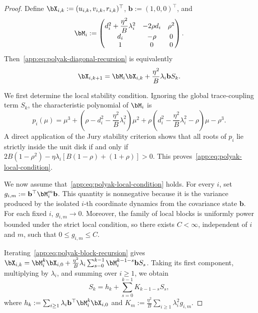 \begin{proof}
Define \(\bX_{i,k}:=(u_{i,k},v_{i,k},r_{i,k})^\top\),
\(\mathbf b:=(1,0,0)^\top\), and
\[
\bM_i
:=
\begin{pmatrix}
d_i^2+\dfrac{\eta^2}{B}\lambda_i^2 & -2\rho d_i & \rho^2\\
d_i & -\rho & 0\\
1 & 0 & 0
\end{pmatrix}.
\]
Then~\eqref{app:eq:polyak-diagonal-recursion} is equivalently
\begin{equation}
\label{app:eq:polyak-block-recursion}
\bX_{i,k+1}
=
\bM_i\bX_{i,k}
+
\frac{\eta^2}{B}\lambda_i\mathbf b S_k.
\end{equation}

We first determine the local stability condition. Ignoring the global trace-coupling term \(S_k\), the characteristic polynomial of \(\bM_i\) is
\[
p_i(\mu)
=
\mu^3
+
\left(\rho-d_i^2-\frac{\eta^2}{B}\lambda_i^2\right)\mu^2
+
\rho\left(d_i^2-\frac{\eta^2}{B}\lambda_i^2-\rho\right)\mu
-\rho^3.
\]
A direct application of the Jury stability criterion shows that all roots of \(p_i\) lie strictly inside the unit disk if and only if
\(2B(1-\rho^2)-\eta\lambda_i[B(1-\rho)+(1+\rho)]>0\).
This proves~\eqref{app:eq:polyak-local-condition}.

We now assume that~\eqref{app:eq:polyak-local-condition} holds. For every \(i\), set
\(g_{i,m}:=\mathbf b^\top\bM_i^m\mathbf b\). This quantity is nonnegative because it is the variance produced by the isolated \(i\)-th coordinate dynamics from the covariance state \(\mathbf b\). For each fixed \(i\), \(g_{i,m}\to0\). Moreover, the family of local blocks is uniformly power bounded under the strict local condition, so there exists \(C<\infty\), independent of \(i\) and \(m\), such that \(0\leq g_{i,m}\leq C\).

Iterating~\eqref{app:eq:polyak-block-recursion} gives
\(\bX_{i,k}=\bM_i^k\bX_{i,0}
+\frac{\eta^2}{B}\lambda_i\sum_{s=0}^{k-1}
\bM_i^{k-1-s}\mathbf bS_s\).
Taking its first component, multiplying by \(\lambda_i\), and summing over \(i\geq1\), we obtain
\begin{equation}
\label{app:eq:polyak-renewal}
S_k
=
h_k
+
\sum_{s=0}^{k-1}K_{k-1-s}S_s,
\end{equation}
where
\(h_k:=\sum_{i\geq1}\lambda_i\mathbf b^\top\bM_i^k\bX_{i,0}\) and
\(K_m:=\frac{\eta^2}{B}\sum_{i\geq1}\lambda_i^2g_{i,m}\).


\end{proof}
